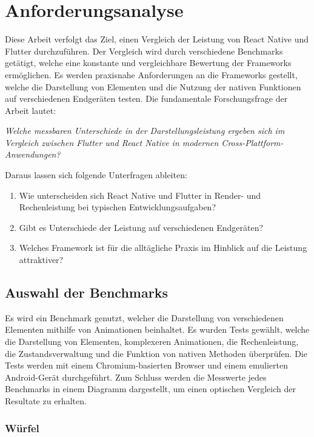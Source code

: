 \section{Anforderungsanalyse}

Diese Arbeit verfolgt das Ziel, einen Vergleich der Leistung von React Native und Flutter durchzuführen. Der Vergleich wird durch verschiedene Benchmarks getätigt, welche eine konstante und vergleichbare Bewertung der Frameworks ermöglichen. Es werden praxisnahe Anforderungen an die Frameworks gestellt, welche die Darstellung von Elementen und die Nutzung der nativen Funktionen auf verschiedenen Endgeräten testen. Die fundamentale Forschungsfrage der Arbeit lautet:

\textit{Welche messbaren Unterschiede in der Darstellungsleistung ergeben sich im Vergleich zwischen Flutter und React Native in modernen Cross-Plattform-Anwendungen?}

Daraus lassen sich folgende Unterfragen ableiten:

\begin{enumerate}
    \item Wie unterscheiden sich React Native und Flutter in Render- und Rechenleistung bei typischen Entwicklungsaufgaben?
    \item Gibt es Unterschiede der Leistung auf verschiedenen Endgeräten?
    \item Welches Framework ist für die alltägliche Praxis im Hinblick auf die Leistung attraktiver?
\end{enumerate}

\subsection{Auswahl der Benchmarks}

Es wird ein Benchmark genutzt, welcher die Darstellung von verschiedenen Elementen mithilfe von Animationen beinhaltet. Es wurden Tests gewählt, welche die Darstellung von Elementen, komplexeren Animationen, die Rechenleistung, die Zustandsverwaltung und die Funktion von nativen Methoden überprüfen. Die Tests werden mit einem Chromium-basierten Browser und einem emulierten Android-Gerät durchgeführt. Zum Schluss werden die Messwerte jedes Benchmarks in einem Diagramm dargestellt, um einen optischen Vergleich der Resultate zu erhalten.

\subsubsection*{Würfel}

